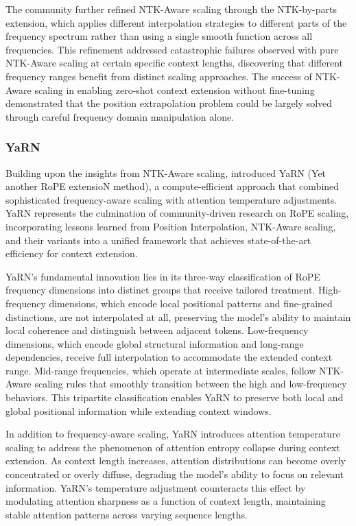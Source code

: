 The community further refined NTK-Aware scaling through the NTK-by-parts extension, which applies different interpolation strategies to different parts of the frequency spectrum rather than using a single smooth function across all frequencies. This refinement addressed catastrophic failures observed with pure NTK-Aware scaling at certain specific context lengths, discovering that different frequency ranges benefit from distinct scaling approaches. The success of NTK-Aware scaling in enabling zero-shot context extension without fine-tuning demonstrated that the position extrapolation problem could be largely solved through careful frequency domain manipulation alone.

\subsubsection{YaRN}

Building upon the insights from NTK-Aware scaling, \citet{peng2024yarn} introduced YaRN (Yet another RoPE extensioN method), a compute-efficient approach that combined sophisticated frequency-aware scaling with attention temperature adjustments. YaRN represents the culmination of community-driven research on RoPE scaling, incorporating lessons learned from Position Interpolation, NTK-Aware scaling, and their variants into a unified framework that achieves state-of-the-art efficiency for context extension.

YaRN's fundamental innovation lies in its three-way classification of RoPE frequency dimensions into distinct groups that receive tailored treatment. High-frequency dimensions, which encode local positional patterns and fine-grained distinctions, are not interpolated at all, preserving the model's ability to maintain local coherence and distinguish between adjacent tokens. Low-frequency dimensions, which encode global structural information and long-range dependencies, receive full interpolation to accommodate the extended context range. Mid-range frequencies, which operate at intermediate scales, follow NTK-Aware scaling rules that smoothly transition between the high and low-frequency behaviors. This tripartite classification enables YaRN to preserve both local and global positional information while extending context windows.

In addition to frequency-aware scaling, YaRN introduces attention temperature scaling to address the phenomenon of attention entropy collapse during context extension. As context length increases, attention distributions can become overly concentrated or overly diffuse, degrading the model's ability to focus on relevant information. YaRN's temperature adjustment counteracts this effect by modulating attention sharpness as a function of context length, maintaining stable attention patterns across varying sequence lengths.

